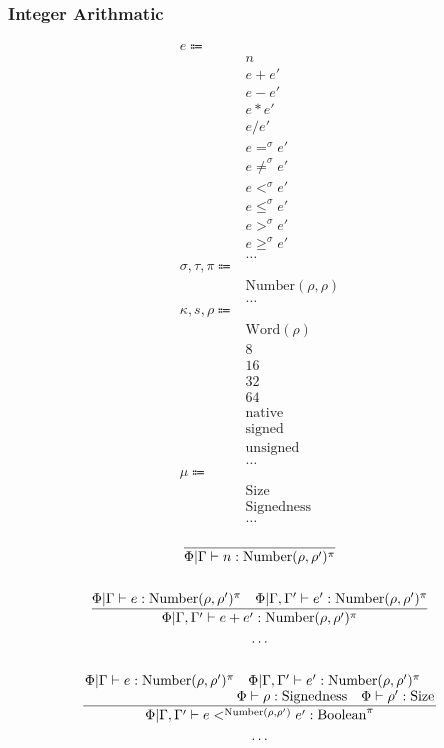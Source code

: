 \documentclass {article}
\begin{document}
\subsubsection{Integer Arithmatic}
\begin{align*}
e \Coloneqq & \\
& n \tag{Numeric Literal} \\
& e + e' \tag{Addition} \\
& e - e' \tag{Subtraction} \\
& e * e' \tag{Multiplication} \\
& e / e' \tag{Division} \\
& e =^\sigma e' \tag {Equality} \\
& e \neq^\sigma e' \tag {Inequality} \\
& e <^\sigma e' \tag {Less Then} \\
& e \leq^\sigma e' \tag {Less Then Equal} \\
& e >^\sigma e' \tag {Greater Then} \\
& e \geq^\sigma e' \tag {Greater Then Equal} \\
& \dots \\
\sigma, \tau, \pi \Coloneqq & \\
& \text{Number} (\rho, \rho) \tag{Number} \\
& \dots \\
\kappa, s, \rho \Coloneqq & \\
& \text{Word} (\rho) \tag{Word Representation} \\
& 8 \tag{Byte Size} \\
& 16 \tag{Short Size} \\
& 32 \tag{Int Size} \\
& 64 \tag{Long Size} \\
& \text{native} \tag{Native Size} \\
& \text{signed} \tag{Signed} \\
& \text{unsigned} \tag{Unsigned} \\
& \dots \\
\mu \Coloneqq & \\
& \text{Size} \\
& \text{Signedness} \\
& \dots
\end{align*}

\begin{gather*}
\frac
{}
{\Phi | \Gamma \vdash n : \text{Number}(\rho, \rho')^\pi} \\
\\
\frac
{\Phi | \Gamma \vdash e : \text{Number}(\rho, \rho')^\pi \quad \Phi | \Gamma, \Gamma' \vdash e' : \text{Number}(\rho, \rho')^\pi}
{\Phi | \Gamma, \Gamma' \vdash e + e' : \text{Number}(\rho, \rho')^\pi} \\
\dots \\
\\
\frac
{\splitfrac{\Phi | \Gamma \vdash e : \text{Number}(\rho, \rho')^\pi \quad \Phi | \Gamma, \Gamma' \vdash e' : \text{Number}(\rho, \rho')^\pi}
{\Phi \vdash \rho : \text{Signedness} \quad \Phi \vdash \rho' : \text{Size}}}
{\Phi | \Gamma, \Gamma' \vdash e <^{\text{Number}(\rho, \rho')} e' : \text{Boolean}^\pi} \\
\dots
\end{gather*}
\end{document}
